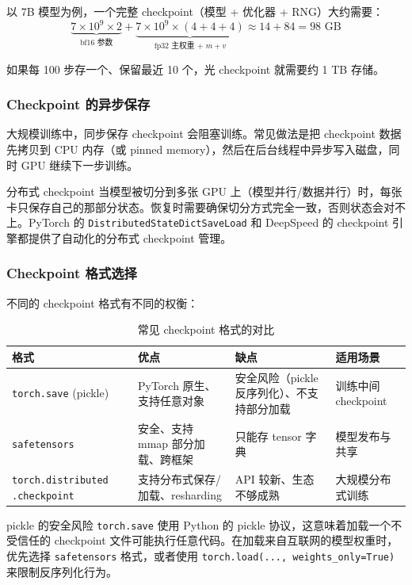以 7B 模型为例，一个完整 checkpoint（模型 + 优化器 + RNG）大约需要：
$$
\underbrace{7 \times 10^9 \times 2}_{\text{bf16 参数}} + \underbrace{7 \times 10^9 \times (4+4+4)}_{\text{fp32 主权重 + } m + v} \approx 14 + 84 = 98 \text{ GB}
$$

如果每 100 步存一个、保留最近 10 个，光 checkpoint 就需要约 1 TB 存储。

\subsubsection{Checkpoint 的异步保存}

大规模训练中，同步保存 checkpoint 会阻塞训练。常见做法是把 checkpoint 数据先拷贝到 CPU 内存（或 pinned memory），然后在后台线程中异步写入磁盘，同时 GPU 继续下一步训练。

\begin{knowledgebox}{分布式 checkpoint}
当模型被切分到多张 GPU 上（模型并行/数据并行）时，每张卡只保存自己的那部分状态。恢复时需要确保切分方式完全一致，否则状态会对不上。PyTorch 的 \texttt{DistributedStateDictSaveLoad} 和 DeepSpeed 的 checkpoint 引擎都提供了自动化的分布式 checkpoint 管理。
\end{knowledgebox}

\subsubsection{Checkpoint 格式选择}

不同的 checkpoint 格式有不同的权衡：

\begin{table}[H]
\centering
\begin{tabular}{p{}p{}p{}p{}}
\toprule
\textbf{格式} & \textbf{优点} & \textbf{缺点} & \textbf{适用场景} \\
\midrule
\texttt{torch.save} (pickle) & PyTorch 原生、支持任意对象 & 安全风险（pickle 反序列化）、不支持部分加载 & 训练中间 checkpoint \\
\texttt{safetensors} & 安全、支持 mmap 部分加载、跨框架 & 只能存 tensor 字典 & 模型发布与共享 \\
\texttt{torch.distributed .checkpoint} & 支持分布式保存/加载、resharding & API 较新、生态不够成熟 & 大规模分布式训练 \\
\bottomrule
\end{tabular}
\caption{常见 checkpoint 格式的对比}
\end{table}

\begin{warningbox}{pickle 的安全风险}
\texttt{torch.save} 使用 Python 的 pickle 协议，这意味着加载一个不受信任的 checkpoint 文件可能执行任意代码。在加载来自互联网的模型权重时，优先选择 \texttt{safetensors} 格式，或者使用 \texttt{torch.load(..., weights\_only=True)} 来限制反序列化行为。
\end{warningbox}

